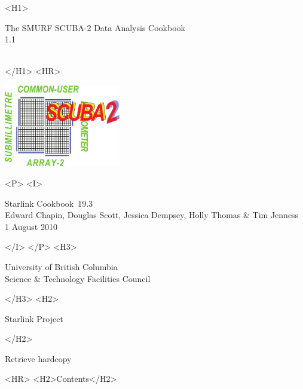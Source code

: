 \documentclass[twoside,11pt]{article}
\newcommand{\stardoccategory}  {Starlink Cookbook}
\newcommand{\stardocsource}    {sc\stardocnumber}
\newcommand{\stardocnumber}    {19.3}
\newcommand{\stardocauthors}   {Edward Chapin, Douglas Scott, Jessica
  Dempsey, Holly Thomas \& Tim Jenness}
\newcommand{\stardocdate}      {1 August 2010}
\newcommand{\stardoctitle}     {The SMURF SCUBA-2 Data Analysis Cookbook}
\newcommand{\stardocversion}   {1.1}
\newcommand{\stardocmanual}    {\ }
\newcommand{\htmladdnormallink}[2]{#1}
\newcommand{\htmladdimg}[1]{}
\newcommand{\htmlref}[2]{#1}
\newcommand{\htmladdtonavigation}[1]{}
\newcommand{\xlabel}[1]{}
\renewcommand{\_}{\texttt{\symbol{95}}}
\begin{document}
\begin{htmlonly}
   \xlabel{}
   \begin{rawhtml} <H1> \end{rawhtml}
      \stardoctitle\\
      \stardocversion\\
      \stardocmanual
   \begin{rawhtml} </H1> <HR> \end{rawhtml}

\includegraphics[width=2.0in]{sc19_logo}

   \begin{rawhtml} <P> <I> \end{rawhtml}
   \stardoccategory\ \stardocnumber \\
   \stardocauthors \\
   \stardocdate
   \begin{rawhtml} </I> </P> <H3> \end{rawhtml}
      \htmladdnormallink{University of British Columbia}
                        {http://www.ubc.ca} \\
      \htmladdnormallink{Science \& Technology Facilities Council}
                        {http://www.scitech.ac.uk} \\
   \begin{rawhtml} </H3> <H2> \end{rawhtml}
      \htmladdnormallink{Starlink Project}{http://www.starlink.ac.uk/}
   \begin{rawhtml} </H2> \end{rawhtml}
   \htmladdnormallink{\htmladdimg{source.gif} Retrieve hardcopy}
      {http://www.starlink.ac.uk/cgi-bin/hcserver?\stardocsource}\\

  \label{stardoccontents}
  \begin{rawhtml}
    <HR>
    <H2>Contents</H2>
  \end{rawhtml}
  \htmladdtonavigation{\htmlref{\htmladdimg{contents_motif.gif}}
        {stardoccontents}}


\end{htmlonly}
\end{document}
